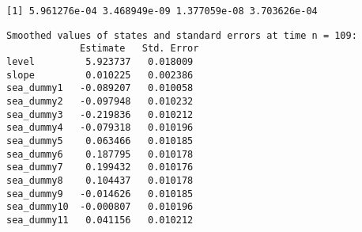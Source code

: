 \documentclass[]{book}
\newenvironment{Shaded}{\begin{snugshade}}{\end{snugshade}}
\newcommand{\KeywordTok}[1]{\textcolor[rgb]{0.13,0.29,0.53}{\textbf{#1}}}
\newcommand{\DataTypeTok}[1]{\textcolor[rgb]{0.13,0.29,0.53}{#1}}
\newcommand{\DecValTok}[1]{\textcolor[rgb]{0.00,0.00,0.81}{#1}}
\newcommand{\StringTok}[1]{\textcolor[rgb]{0.31,0.60,0.02}{#1}}
\newcommand{\CommentTok}[1]{\textcolor[rgb]{0.56,0.35,0.01}{\textit{#1}}}
\newcommand{\OtherTok}[1]{\textcolor[rgb]{0.56,0.35,0.01}{#1}}
\newcommand{\OperatorTok}[1]{\textcolor[rgb]{0.81,0.36,0.00}{\textbf{#1}}}
\newcommand{\NormalTok}[1]{#1}
\begin{document}
\begin{Shaded}
\end{Shaded}

\begin{verbatim}
[1] 5.961276e-04 3.468949e-09 1.377059e-08 3.703626e-04
\end{verbatim}

\begin{Shaded}
\end{Shaded}

\begin{verbatim}
Smoothed values of states and standard errors at time n = 109:
             Estimate   Std. Error
level         5.923737   0.018009 
slope         0.010225   0.002386 
sea_dummy1   -0.089207   0.010058 
sea_dummy2   -0.097948   0.010232 
sea_dummy3   -0.219836   0.010212 
sea_dummy4   -0.079318   0.010196 
sea_dummy5    0.063466   0.010185 
sea_dummy6    0.187795   0.010178 
sea_dummy7    0.199432   0.010176 
sea_dummy8    0.104437   0.010178 
sea_dummy9   -0.014626   0.010185 
sea_dummy10  -0.000807   0.010196 
sea_dummy11   0.041156   0.010212 
\end{verbatim}
\end{document}
